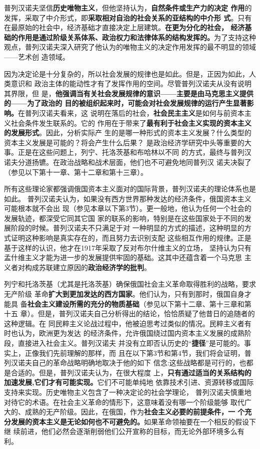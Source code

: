 普列汉诺夫坚信\textbf{历史唯物主义}，但他坚持认为，\textbf{自然条件或生产力的决定
  作用}的发挥，采取了中介形式，即\textbf{采取相对自治的社会关系的亚结构的中介形
  式}。只有在最原始的社会中，经济基础才直接决定上层建筑。\textbf{在更为分化的社会，
  经济基础的作用是通过阶级关系体系、政治权力和法律体系的结构发挥的。}为了支持这种
观点，普列汉诺夫深入研究了他认为的唯物主义的决定作用发挥的最不明显的领域——艺术创
造领域。

因为决定论是十分复杂的，所以社会发展的规律也是如此。但是，正因为如此，人类意识和
政治主体的能动性才有了发挥作用的空间。尽管普列汉诺夫从没有说明其界限，但
是，\textbf{他强调当有关社会发展规律的意识——主要是由马克思主义提供的——为了政治的
  目的被组织起来时，可能会对社会发展规律的运行产生显著影响。}在普列汉诺夫看来，这
说明在落后的社会，\textbf{社会民主主义}是如何与前资本主义社会条件发生联系的。它的
作用在于带来了\textbf{最有利于社会主义实现的资本主义的发展形式}。因此，分析实际产
生的是哪一种形式的资本主义发展？什么类型的资本主义发展是可能的？将会产生什么后果？
是政治经济学研究中头等重要的大事。正是在这些问题上，列宁、托洛茨基和布哈林以不同
的方式，最终与普列汉诺夫分道扬镳。在政治战略和战术层面，他们也不可避免地同普列汉
诺夫决裂了（参见以下第十一章、第十二章和第十三章）。

所有这些理论家都强调俄国资本主义面对的国际背景，普列汉诺夫的理论体系也是如此。
普列汉诺夫认为，如果没有西方世界那种发达的经济条件，俄国资本主义可能根本就不会出
现（参见本章以下第3节）。更一般地，他认为任何一个社会的发展轨迹，都深受它同其它国
家的联系的影响，特别是在这些国家处于不同的发展阶段的时候。普列汉诺夫不只满足于对
一种明显的方式的描述，这种明显的方式证明这种影响是真实存在的，而且努力去识别支配
这些相互作用的规律。正是基于这样的认识，他才在1917年采取了反对布尔什维主义的立场，
坚持认为只有孟什维主义才能为进一步的发展提供牢固的基础。这其中还蕴含着一个马克思
主义者对构成苏联建立原因的\textbf{政治经济学的批判}。

列宁和托洛茨基（尤其是托洛茨基）确保俄国社会主义革命取得胜利的战略，要求无产阶级
革命\textbf{扩大到更加发达的西方国家}。他们认为，只有到那时，俄国自身才能具
备\textbf{社会主义建设所需的充分的物质基础}（参见以下第十二章、第十三章和第十五
章）。但是，普列汉诺夫自己分析得出的结论，恰恰质疑了他昔日的追随者的这种逻辑。在
同民粹主义论战过程中，他被迫思考过类似的情况。民粹主义者有时也认为，欧洲更为发达
的经济条件，允许俄国绕过国内资本主义发展的成熟阶段，直接进入社会主义。普列汉诺夫
并没有立即否认历史的“\textbf{捷径}”是可能的。事实上，正像我们先前理解的那样，而
且在以下第3节和第4节，我们将会证明，普列汉诺夫自己的革命战略明确地取决于他的如下
信念:这些战略都是可行的，也都是合适的。但是，普列汉诺夫认为，在很大程度
上，\textbf{只有通过适当的关系结构的加速发展,它们才有可能实现。}它们不可能单纯地
依靠技术引进、资源转移或国际支持来实现。历史唯物主义包含了一种决定论的社会学理论，
普列汉诺夫慎重地对待它的术语。在社会主义革命的情形下，这意味着没有哪一个阶级能够
取代广大的、成熟的无产阶级。因此，在俄国，作为\textbf{社会主义必要的前提条件，一
  个充分发展的资本主义是无论如何也不可避免的。}如果革命领袖要在一个相反的假设下继
续前进，他们必然会逐渐削弱他们公开宣称的目标，而无论外部环境多么有利。

